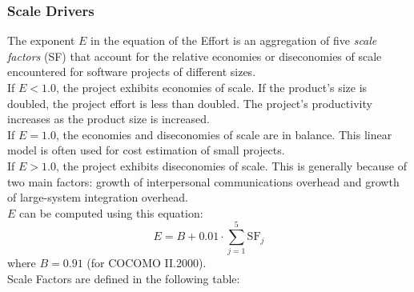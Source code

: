 \subsubsection{Scale Drivers}
The exponent $E$ in the equation of the Effort is an aggregation of five \textit{scale factors} (SF) that account
for the relative economies or diseconomies of scale encountered for software projects of different
sizes. \\
If $E < 1.0$, the project exhibits economies of scale. If the product's
size is doubled, the project effort is less than doubled. The project's productivity increases as the
product size is increased. \\
If $E = 1.0$, the economies and diseconomies of scale are in balance. This linear model is
often used for cost estimation of small projects. \\
If $E > 1.0$, the project exhibits diseconomies of scale. This is generally because of two
main factors: growth of interpersonal communications overhead and growth of large-system
integration overhead. \\
$E$ can be computed using this equation:
$$ E = B + 0.01 \cdot \sum_{j=1}^{5} \textrm{SF}_j $$
where $B = 0.91$ (for COCOMO II.2000). \\
Scale Factors are defined in the following table:
\label{sec:sd}

